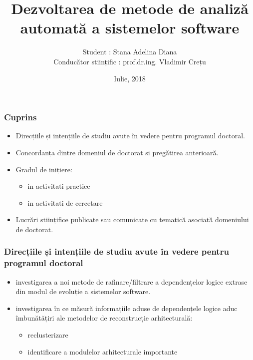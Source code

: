 \documentclass{beamer}
\title[Pres]{Dezvoltarea de metode de analiză automată a sistemelor software}
\author{Student : Stana Adelina Diana\\Conducător stiințific :  prof.dr.ing. Vladimir Crețu}
\institute{Departamentul Calculatoare şi Tehnologia Informaţiei\\
Universitatea Politehnica Timișoara}
\date{Iulie, 2018}
\begin{document}
\begin{frame}
  \titlepage
\end{frame}

 \begin{frame}
\frametitle{Cuprins}

\begin{itemize}
\item Direcțiile și intențiile de studiu avute în vedere pentru programul doctoral.
\item Concordanța dintre domeniul de doctorat si pregătirea anterioară.
\item Gradul de inițiere:
\begin{itemize}
\item in activitati practice
\item in activitati de cercetare
\end{itemize}
\item Lucrări stiințifice publicate sau comunicate cu tematică asociată domeniului de doctorat.
\end{itemize}

\end{frame}

 \begin{frame}
\frametitle{Direcțiile și intențiile de studiu avute în vedere pentru programul doctoral}

\begin{itemize}
\item investigarea a noi metode de rafinare/filtrare a dependențelor logice extrase din modul de evoluție a sistemelor software.
\item  investigarea în ce măsură informațiile aduse de dependențele logice aduc îmbunătățiri ale metodelor de reconstrucție arhitecturală:
\begin{itemize}
\item reclusterizare
\item identificare a modulelor arhitecturale importante
\end{itemize}
\end{itemize}

\end{frame}
\end{document}
